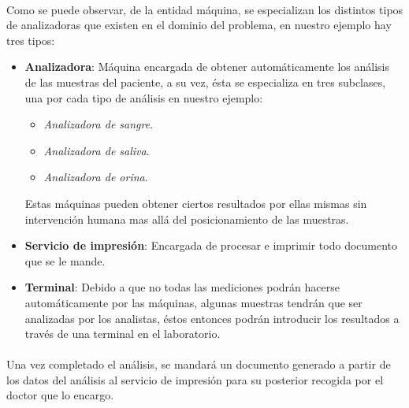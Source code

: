 \documentclass[a4paper,10pt]{article}
\begin{document}
\paragraph{}
Como se puede observar, de la entidad máquina, se especializan los distintos tipos de analizadoras que existen en el dominio del problema, en nuestro ejemplo hay tres tipos:
\begin{itemize}
	\item {\bf Analizadora}: Máquina encargada de obtener automáticamente los análisis de las muestras del paciente, a su vez, ésta se especializa en tres subclases, una por cada tipo de análisis en nuestro ejemplo:
	\begin{itemize}
		\item {\it Analizadora de sangre}.
		\item {\it Analizadora de saliva}.
		\item {\it Analizadora de orina}.
	\end{itemize}
	Estas máquinas pueden obtener ciertos resultados por ellas mismas sin intervención humana mas allá del posicionamiento de las muestras.
	\item {\bf Servicio de impresión}: Encargada de procesar e imprimir todo documento que se le mande.
	\item {\bf Terminal}: Debido a que no todas las mediciones podrán hacerse automáticamente por las máquinas, algunas muestras tendrán que ser analizadas por los analistas, éstos entonces podrán introducir los resultados a través de una terminal en el laboratorio.
\end{itemize}
\paragraph{}
Una vez completado el análisis, se mandará un documento generado a partir de los datos del análisis al servicio de impresión para su posterior recogida por el doctor que lo encargo.\\

\end{document}
